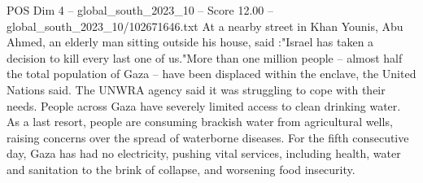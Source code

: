 \begin{textsample}{POS Dim 4 – global\_south\_2023\_10 – Score 12.00 – global\_south\_2023\_10/102671646.txt}
At a nearby street in Khan Younis, Abu Ahmed, an elderly man sitting outside his house, said :"Israel has taken a decision to kill every last one of us."More than one million people -- almost half the total population of Gaza -- have been displaced within the enclave, the United Nations said.
The UNWRA agency said it was struggling to cope with their needs.
People across Gaza have severely limited access to clean drinking water.
As a last resort, people are consuming brackish water from agricultural wells, raising concerns over the spread of waterborne diseases.
For the fifth consecutive day, Gaza has had no electricity, pushing vital services, including health, water and sanitation to the brink of collapse, and worsening food insecurity.

\end{textsample}

